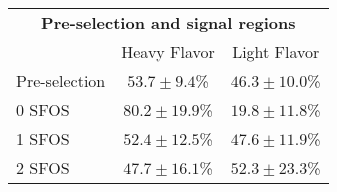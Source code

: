     \begin{tabular}{|l||cc|}
    \hline 
    \multicolumn{3}{|c|}{\bf{Pre-selection and signal regions}}   \\ 
    & Heavy Flavor & Light Flavor \\
    \hline \hline
    \hline

    Pre-selection &$53.7 \pm 9.4$\% & $46.3\pm 10.0$\% \\
    0 SFOS &$80.2 \pm 19.9$\% & $19.8\pm 11.8$\% \\
    1 SFOS &$52.4 \pm 12.5$\% & $47.6\pm 11.9$\% \\
    2 SFOS &$47.7 \pm 16.1$\% & $52.3\pm 23.3$\% \\
    \hline


  \end{tabular}
  







